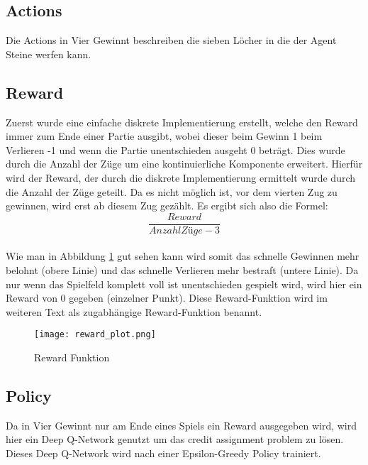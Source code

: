 \subsection{Actions}
Die Actions in Vier Gewinnt beschreiben die sieben Löcher in die der Agent Steine werfen kann.\\

\subsection{Reward}
 Zuerst wurde eine einfache diskrete Implementierung erstellt, welche den Reward immer zum Ende einer Partie ausgibt, wobei dieser beim Gewinn 1 beim Verlieren -1 und wenn die Partie unentschieden ausgeht 0 beträgt.
Dies wurde durch die Anzahl der Züge um eine kontinuierliche Komponente erweitert. Hierfür wird der Reward, der durch die diskrete Implementierung ermittelt wurde durch die Anzahl der Züge geteilt. Da es nicht möglich ist, vor dem vierten Zug zu gewinnen, wird erst ab diesem Zug gezählt. Es ergibt sich also die Formel: \\$$\frac{Reward}{Anzahl Züge-3}$$\\
Wie man in Abbildung \ref{fig:reward_function} gut sehen kann wird somit das schnelle Gewinnen mehr belohnt (obere Linie) und das schnelle Verlieren mehr bestraft (untere Linie). Da nur wenn das Spielfeld komplett voll ist unentschieden gespielt wird, wird hier ein Reward von 0 gegeben (einzelner Punkt). Diese Reward-Funktion wird im weiteren Text als zugabhängige Reward-Funktion benannt. \\

\begin{figure}[h!]
  \texttt{[image: reward\_plot.png]}
  \centering
  \caption{Reward Funktion}
  \label{fig:reward_function}
\end{figure}

\subsection{Policy}
Da in Vier Gewinnt nur am Ende eines Spiels ein Reward ausgegeben wird, wird hier ein Deep Q-Network genutzt um das credit assignment problem zu lösen. 
Dieses Deep Q-Network wird nach einer Epsilon-Greedy Policy trainiert.

